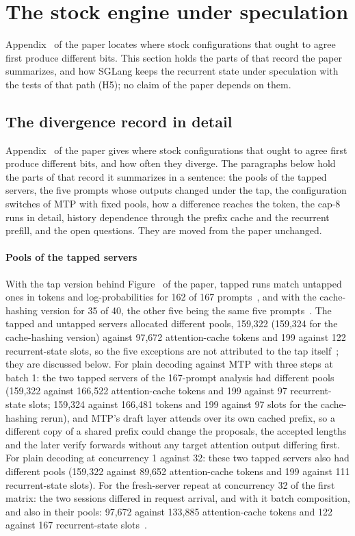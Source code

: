 \section{The stock engine under speculation}\label{notes:engine}
Appendix~ of the paper locates where stock configurations that ought to agree first produce different bits. This section holds the parts of that record the paper summarizes, and how SGLang keeps the recurrent state under speculation with the tests of that path (H5); no claim of the paper depends on them.

\subsection{The divergence record in detail}\label{notes:divergence}
Appendix~ of the paper gives where stock configurations that ought to agree first produce different bits, and how often they diverge. The paragraphs below hold the parts of that record it summarizes in a sentence: the pools of the tapped servers, the five prompts whose outputs changed under the tap, the configuration switches of MTP with fixed pools, how a difference reaches the token, the cap-8 runs in detail, history dependence through the prefix cache and the recurrent prefill, and the open questions. They are moved from the paper unchanged.

\paragraph{Pools of the tapped servers} With the tap version behind Figure~ of the paper, tapped runs match untapped ones in tokens and log-probabilities for 162 of 167 prompts~, and with the cache-hashing version for 35 of 40, the other five being the same five prompts~. The tapped and untapped servers allocated different pools, 159,322 (159,324 for the cache-hashing version) against 97,672 attention-cache tokens and 199 against 122 recurrent-state slots, so the five exceptions are not attributed to the tap itself~; they are discussed below. For plain decoding against MTP with three steps at batch 1: the two tapped servers of the 167-prompt analysis had different pools (159,322 against 166,522 attention-cache tokens and 199 against 97 recurrent-state slots; 159,324 against 166,481 tokens and 199 against 97 slots for the cache-hashing rerun), and MTP's draft layer attends over its own cached prefix, so a different copy of a shared prefix could change the proposals, the accepted lengths and the later verify forwards without any target attention output differing first. For plain decoding at concurrency 1 against 32: these two tapped servers also had different pools (159,322 against 89,652 attention-cache tokens and 199 against 111 recurrent-state slots). For the fresh-server repeat at concurrency 32 of the first matrix: the two sessions differed in request arrival, and with it batch composition, and also in their pools: 97,672 against 133,885 attention-cache tokens and 122 against 167 recurrent-state slots~.

